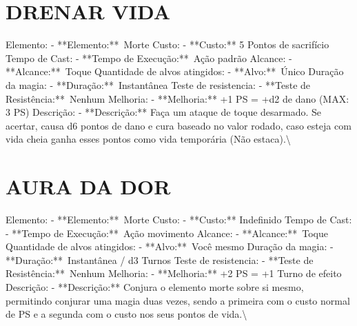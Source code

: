 \documentclass{article}%
\begin{document}
\section{DRENAR VIDA}%
\label{sec:DRENARVIDA}%
Elemento: {-} **Elemento:**~Morte\newline%
Custo: {-} **Custo:** 5 Pontos de sacrifício\newline%
Tempo de Cast: {-} **Tempo de Execução:**~Ação padrão\newline%
Alcance: {-} **Alcance:**~Toque\newline%
Quantidade de alvos atingidos: {-} **Alvo:**~Único\newline%
Duração da magia: {-} **Duração:**~Instantânea\newline%
Teste de resistencia: {-} **Teste de Resistência:**~Nenhum\newline%
Melhoria: {-} **Melhoria:** +1 PS = +d2 de dano (MAX: 3 PS)\newline%
Descrição: {-} **Descrição:** Faça um ataque de toque desarmado. Se acertar, causa d6 pontos de dano e cura baseado no valor rodado, caso esteja com vida cheia ganha esses pontos como vida temporária (Não estaca).\textbackslash{}

%
\section{AURA DA DOR}%
\label{sec:AURADADOR}%
Elemento: {-} **Elemento:**~Morte\newline%
Custo: {-} **Custo:** Indefinido\newline%
Tempo de Cast: {-} **Tempo de Execução:**~Ação movimento\newline%
Alcance: {-} **Alcance:**~Toque\newline%
Quantidade de alvos atingidos: {-} **Alvo:**~Você mesmo\newline%
Duração da magia: {-} **Duração:**~Instantânea / d3 Turnos\newline%
Teste de resistencia: {-} **Teste de Resistência:**~Nenhum\newline%
Melhoria: {-} **Melhoria:** +2 PS = +1 Turno de efeito\newline%
Descrição: {-} **Descrição:** Conjura o elemento morte sobre si mesmo, permitindo conjurar uma magia duas vezes, sendo a primeira com o custo normal de PS e a segunda com o custo nos seus pontos de vida.\textbackslash{}

%
\end{document}
